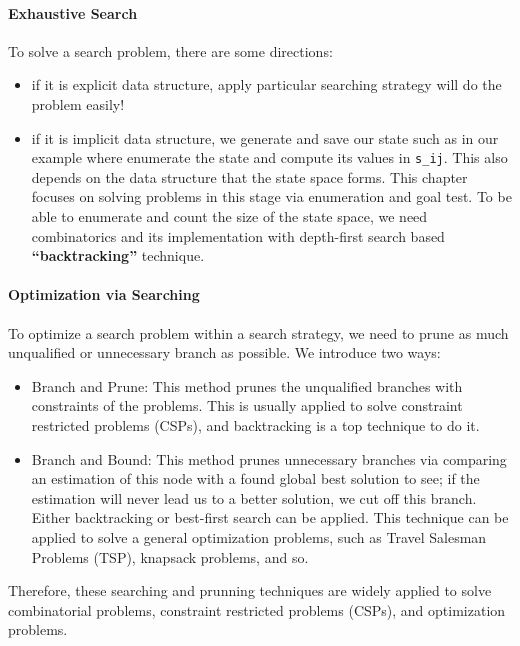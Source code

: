 \documentclass[../main.tex]{subfiles}
\begin{document}
\paragraph{Exhaustive Search} To solve a search problem, there are some directions:
\begin{itemize}
\item if it is explicit data structure, apply particular searching strategy will do the problem easily!
\item if it is implicit data structure, we generate and save our state such as in our example where enumerate the state and compute its values in \texttt{s\_{ij}}. This also depends on the data structure that the state space forms. This chapter focuses on solving problems in this stage via enumeration and goal test. To be able to enumerate and count the size of the state space, we need combinatorics and its implementation with depth-first search based \textbf{``backtracking''} technique.   
\end{itemize}
\paragraph{Optimization via Searching} To optimize a search problem within a search strategy, we need to prune as much  unqualified or unnecessary branch as possible. We introduce two ways:
\begin{itemize}
    \item Branch and Prune: This method prunes the unqualified branches with constraints of the problems. This is usually applied to solve constraint restricted problems (CSPs), and backtracking is a top technique to do it.  
    \item Branch and Bound: This method prunes unnecessary branches via comparing an estimation of this node with a found global best solution to see; if the estimation will never lead us to a better solution, we cut off this branch. Either backtracking or best-first search can be applied. This technique can be applied to solve a general optimization problems, such as Travel Salesman Problems (TSP), knapsack problems, and so.
\end{itemize}
Therefore, these searching and prunning techniques are  widely applied to solve combinatorial problems, constraint restricted problems (CSPs), and optimization problems.
\end{document}
